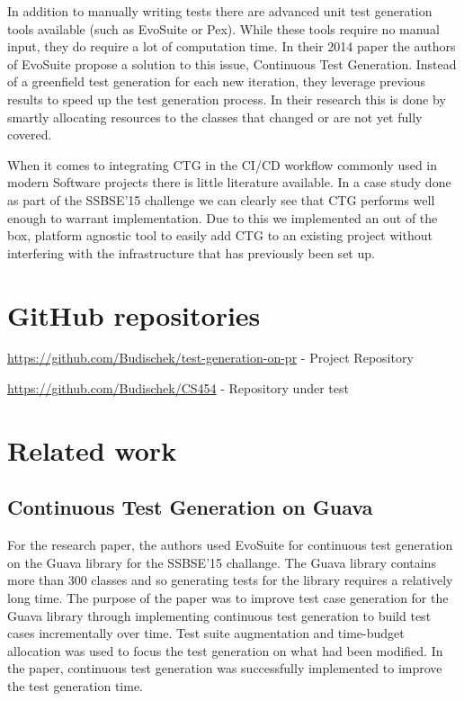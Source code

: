 \documentclass[12pt, a4paper]{article}
\begin{document}
In addition to manually writing tests there are advanced unit test generation tools available (such as EvoSuite or Pex). While these tools require no manual input, they do require a lot of computation time. In their 2014 paper \cite{campos_continuous_2014} the authors of EvoSuite propose a solution to this issue, Continuous Test Generation. Instead of a greenfield test generation for each new iteration, they leverage previous results to speed up the test generation process. In their research this is done by smartly allocating resources to the classes that changed or are not yet fully covered.

When it comes to integrating CTG in the CI/CD workflow commonly used in modern Software projects there is little literature available. In a case study done as part of the SSBSE'15 challenge \cite{barros_continuous_2015} we can clearly see that CTG performs well enough to warrant implementation. Due to this we implemented an out of the box, platform agnostic tool to easily add CTG to an existing project without interfering with the infrastructure that has previously been set up.



\section{GitHub repositories}
\url{https://github.com/Budischek/test-generation-on-pr} - Project Repository

\url{https://github.com/Budischek/CS454} - Repository under test



\section{Related work}
\subsection{Continuous Test Generation on Guava}
For the \cite{barros_continuous_2015} research paper, the authors used EvoSuite for continuous test generation on the Guava library for the SSBSE'15 challange. The Guava library contains more than 300 classes and so generating tests for the library requires a relatively long time. The purpose of the paper was to improve test case generation for the Guava library through implementing continuous test generation to build test cases incrementally over time. Test suite augmentation and time-budget allocation was used to focus the test generation on what had been modified. In the paper, continuous test generation was successfully implemented to improve the test generation time.
\end{document}
